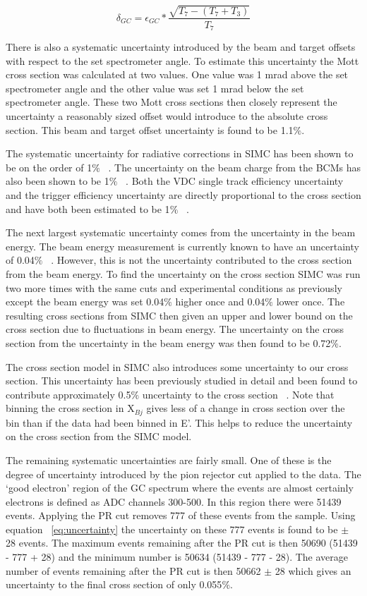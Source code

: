 \begin{equation} \label{eq:gc_uncertainty}
	\delta_{GC} = \epsilon_{GC} * \frac{\sqrt{T_7-(T_7+T_3)}}{T_7}
\end{equation}

There is also a systematic uncertainty introduced by the beam and target offsets with respect to the set spectrometer angle. To estimate this uncertainty the Mott cross section was calculated at two values. One value was 1 mrad above the set spectrometer angle and the other value was set 1 mrad below the set spectrometer angle. These two Mott cross sections then closely represent the uncertainty a reasonably sized offset would introduce to the absolute cross section. This beam and target offset uncertainty is found to be 1.1$\%$.

The systematic uncertainty for radiative corrections in SIMC has been shown to be on the order of 1$\%$ ~\cite{Thesis:Wang}. The uncertainty on the beam charge from the BCMs has also been shown to be 1$\%$ ~\cite{Thesis:Wang}. Both the VDC single track efficiency uncertainty and the trigger efficiency uncertainty are directly proportional to the cross section and have both been estimated to be 1$\%$ ~\cite{Thesis:Ye}.

The next largest systematic uncertainty comes from the uncertainty in the beam energy. The beam energy measurement is currently known to have an uncertainty of 0.04$\%$ ~\cite{doug}. However, this is not the uncertainty contributed to the cross section from the beam energy. To find the uncertainty on the cross section SIMC was run two more times with the same cuts and experimental conditions as previously except the beam energy was set 0.04$\%$ higher once and 0.04$\%$ lower once. The resulting cross sections from SIMC then given an upper and lower bound on the cross section due to fluctuations in beam energy. The uncertainty on the cross section from the uncertainty in the beam energy was then found to be 0.72$\%$.

The cross section model in SIMC also introduces some uncertainty to our cross section. This uncertainty has been previously studied in detail and been found to contribute approximately 0.5$\%$ uncertainty to the cross section ~\cite{Thesis:Nguyen}. Note that binning the cross section in X$_{Bj}$ gives less of a change in cross section over the bin than if the data had been binned in E'. This helps to reduce the uncertainty on the cross section from the SIMC model.

The remaining systematic uncertainties are fairly small. One of these is the degree of uncertainty introduced by the pion rejector cut applied to the data. The `good electron' region of the GC spectrum where the events are almost certainly electrons is defined as ADC channels 300-500. In this region there were 51439 events. Applying the PR cut removes 777 of these events from the sample. Using equation ~\ref{eq:uncertainty} the uncertainty on these 777 events is found to be $\pm$ 28 events. The maximum events remaining after the PR cut is then 50690 (51439 - 777 + 28) and the minimum number is 50634 (51439 - 777 - 28). The average number of events remaining after the PR cut is then 50662 $\pm$ 28 which gives an uncertainty to the final cross section of only 0.055$\%$.

